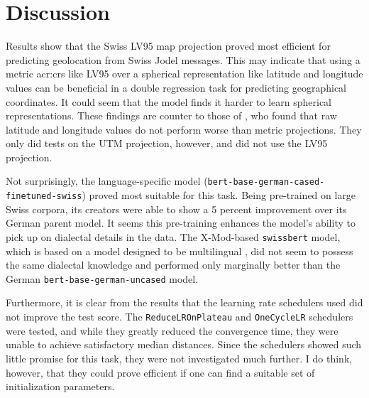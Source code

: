 \section{Discussion}
\label{sec:Discussion}

\begin{comment}
It is important to include a discussion, which describes what you have learned so far, the merits of the work as well as its limitations.
It can be a separate section or it can appear together with the results or be part of the conclusion).
When evaluating your results, avoid drawing grand conclusions, beyond those that your results can in fact support.
Further, although you may have designed your experiments to answer certain questions,
the results may raise other questions in the eyes of the reader.
It is important that you study the graphs/tables to look for unusual features/entries, and discuss these as well as the main findings.
In particular, carry out an error analysis: b went wrong and why?
\end{comment}

Results show that the Swiss LV95 map projection proved most efficient for predicting geolocation from Swiss Jodel messages. This may indicate that using a metric \gls{acr:crs} like LV95 over a spherical representation like latitude and longitude values can be beneficial in a double regression task for predicting geographical coordinates. It could seem that the model finds it harder to learn spherical representations. These findings are counter to those of \cite[5]{scherrerHeLjuVarDial20202020}, who found that raw latitude and longitude values do not perform worse than metric projections. They only did tests on the UTM projection, however, and did not use the LV95 projection.

Not surprisingly, the language-specific model (\texttt{bert-base-german-cased-finetuned-swiss}) proved most suitable for this task. Being pre-trained on large Swiss corpora, its creators were able to show a 5 percent improvement over its German parent model. It seems this pre-training enhances the model's ability to pick up on dialectal details in the data. The X-Mod-based \texttt{swissbert} model, which is based on a model designed to be multilingual \citep{pfeifferLiftingCurseMultilinguality2022}, did not seem to possess the same dialectal knowledge and performed only marginally better than the German \texttt{bert-base-german-uncased} model.

Furthermore, it is clear from the results that the learning rate schedulers used did not improve the test score. The \texttt{ReduceLROnPlateau} and \texttt{OneCycleLR} schedulers were tested, and while they greatly reduced the convergence time, they were unable to achieve satisfactory median distances. Since the schedulers showed such little promise for this task, they were not investigated much further. I do think, however, that they could prove efficient if one can find a suitable set of initialization parameters.

